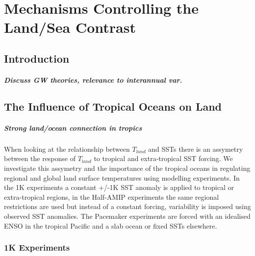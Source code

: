 \chapter{Mechanisms Controlling the Land/Sea Contrast} 


\label{mechanisms} 


\section{Introduction}
\paragraph{Discuss GW theories, relevance to interannual var.}


\section{The Influence of Tropical Oceans on Land}

\paragraph{Strong land/ocean connection in tropics}
When looking at the relationship between $T_{land}$ and SSTs there is an 
assymetry between the response of $T_{land}$ to tropical and extra-tropical SST 
forcing. We investigate this assymetry and the importance of the tropical oceans 
in regulating regional and global land surface temperatures using modelling 
experiments. In the 1K experiments a constant +/-1K SST anomaly is applied to 
tropical or extra-tropical regions, in the Half-AMIP experiments the same 
regional restrictions are used but instead of a constant forcing, variability is 
imposed using observed SST anomalies. The Pacemaker experiments are forced with 
an idealised ENSO in the tropical Pacific and a slab ocean or fixed SSTs 
elsewhere.

\subsection{1K Experiments}

